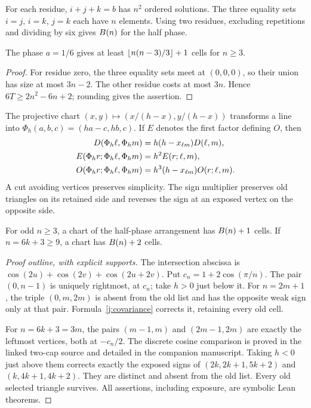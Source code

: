 For each residue, $i+j+k=b$ has $n^2$ ordered solutions. The three equality sets $i=j$, $i=k$, $j=k$ each have $n$ elements. Using two residues, excluding repetitions and dividing by six gives $B(n)$ for the half phase.
\begin{lemma}\label{j:phase}
The phase $a=1/6$ gives at least $\left\lfloor n(n-3)/3\right\rfloor+1$ cells for $n\ge3$.
\end{lemma}
\begin{proof}
For residue zero, the three equality sets meet at $(0,0,0)$, so their union has size at most $3n-2$. The other residue costs at most $3n$. Hence $6T\ge2n^2-6n+2$; rounding gives the assertion.
\end{proof}

The projective chart $(x,y)\mapsto(x/(h-x),y/(h-x))$ transforms a line into $\Phi_h(a,b,c)=(ha-c,hb,c)$. If $E$ denotes the first factor defining $O$, then
\begin{align}
 D(\Phi_h\ell,\Phi_hm)&=h(h-x_{\ell m})D(\ell,m),\notag\\
 E(\Phi_hr;\Phi_h\ell,\Phi_hm)&=h^2E(r;\ell,m),\notag\\
 O(\Phi_hr;\Phi_h\ell,\Phi_hm)&=h^3(h-x_{\ell m})O(r;\ell,m).\label{j:covariance}
\end{align}
A cut avoiding vertices preserves simplicity. The sign multiplier preserves old triangles on its retained side and reverses the sign at an exposed vertex on the opposite side.

\begin{lemma}\label{j:caps}
For odd $n\ge3$, a chart of the half-phase arrangement has $B(n)+1$ cells. If $n=6k+3\ge9$, a chart has $B(n)+2$ cells.
\end{lemma}
\begin{proof}[Proof outline, with explicit supports]
The intersection abscissa is $\cos(2u)+\cos(2v)+\cos(2u+2v)$. Put $c_n=1+2\cos(\pi/n)$. The pair $(0,n-1)$ is uniquely rightmost, at $c_n$; take $h>0$ just below it. For $n=2m+1$, the triple $(0,m,2m)$ is absent from the old list and has the opposite weak sign only at that pair. Formula~\eqref{j:covariance} corrects it, retaining every old cell.

For $n=6k+3=3m$, the pairs $(m-1,m)$ and $(2m-1,2m)$ are exactly the leftmost vertices, both at $-c_n/2$. The discrete cosine comparison is proved in the linked two-cap source and detailed in the companion manuscript. Taking $h<0$ just above them corrects exactly the exposed signs of $(2k,2k+1,5k+2)$ and $(k,4k+1,4k+2)$. They are distinct and absent from the old list. Every old selected triangle survives. All assertions, including exposure, are symbolic Lean theorems.
\end{proof}

